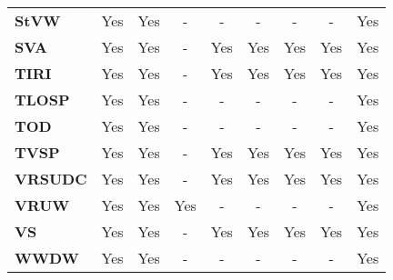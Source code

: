\begin{table}[ht!]
\begin{tabular}{lcccccccc}
\textbf{StVW}        & Yes             & Yes             & -                   & -              & -                    & -                     & -                     & Yes             \\
\textbf{SVA}         & Yes             & Yes             & -                   & Yes            & Yes                  & Yes                   & Yes                   & Yes             \\
\textbf{TIRI}        & Yes             & Yes             & -                   & Yes            & Yes                  & Yes                   & Yes                   & Yes             \\
\textbf{TLOSP}       & Yes             & Yes             & -                   & -              & -                    & -                     & -                     & Yes             \\
\textbf{TOD}         & Yes             & Yes             & -                   & -              & -                    & -                     & -                     & Yes             \\
\textbf{TVSP}        & Yes             & Yes             & -                   & Yes            & Yes                  & Yes                   & Yes                   & Yes             \\
\textbf{VRSUDC}      & Yes             & Yes             & -                   & Yes            & Yes                  & Yes                   & Yes                   & Yes             \\
\textbf{VRUW}        & Yes             & Yes             & Yes                 & -              & -                    & -                     & -                     & Yes             \\
\textbf{VS}          & Yes             & Yes             & -                   & Yes            & Yes                  & Yes                   & Yes                   & Yes             \\
\textbf{WWDW}        & Yes             & Yes             & -                   & -              & -                    & -                     & -                     & Yes            \\
\hline
\end{tabular}
\end{table}


